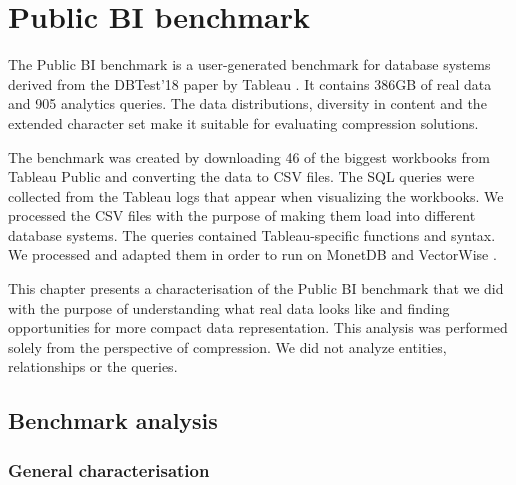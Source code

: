 
\chapter{Public BI benchmark} %
\label{ch:pbib}


\graphicspath{{3_pbib/images/}}

% 

The Public BI benchmark \cite{pbib} is a user-generated benchmark for database systems derived from the DBTest'18 paper by Tableau \cite{vogelsgesang2018get}. It contains 386GB of real data and 905 analytics queries. The data distributions, diversity in content and the extended character set make it suitable for evaluating compression solutions.

The benchmark was created by downloading 46 of the biggest workbooks from Tableau Public \cite{tableaupublic} and converting the data to CSV files. The SQL queries were collected from the Tableau logs that appear when visualizing the workbooks. We processed the CSV files with the purpose of making them load into different database systems. The queries contained Tableau-specific functions and syntax. We processed and adapted them in order to run on MonetDB \cite{boncz2005monetdb} and VectorWise \cite{zukowski2012vectorwise}. 


This chapter presents a characterisation of the Public BI benchmark that we did with the purpose of understanding what real data looks like and finding opportunities for more compact data representation. This analysis was performed solely from the perspective of compression. We did not analyze entities, relationships or the queries.

\section{Benchmark analysis}
\label{sec:pbib:characterisation}

\subsection{General characterisation}

